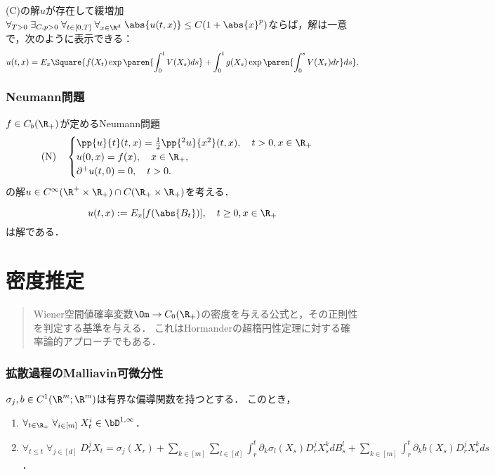 \documentclass[uplatex,dvipdfmx]{jsreport}
\begin{document}
\begin{theorem}
    (C)の解$u$が存在して緩増加$\forall_{T>0}\;\exists_{C,p>0}\;\forall_{t\in[0,T]}\;\forall_{x\in\R^d}\;\abs{u(t,x)}\le C(1+\abs{x}^p)$ならば，解は一意で，次のように表示できる：
    \[u(t,x)=E_x\Square{f(X_t)\exp\paren{\int^t_0V(X_s)ds}+\int^t_0g(X_s)\exp\paren{\int^s_0V(X_r)dr}ds}.\]
\end{theorem}

\subsection{Neumann問題}

\begin{problem}
    $f\in C_b(\R_+)$が定めるNeumann問題
    \[\mathrm{(N)}\quad\begin{cases}
        \pp{u}{t}(t,x)=\frac{1}{2}\pp{^2u}{x^2}(t,x),\quad t>0,x\in\R_+\\
        u(0,x)=f(x),\quad x\in\R_+,\\
        \partial^+u(t,0)=0,\quad t>0.
    \end{cases}\]
    の解$u\in C^\infty(\R^+\times\R_+)\cap C(\R_+\times\R_+)$を考える．
\end{problem}

\begin{theorem}\label{thm-solution-to-Neumann-problem}
    \[u(t,x):=E_x[f(\abs{B_t})],\quad t\ge0,x\in\R_+\]
    は解である．
\end{theorem}

\chapter{密度推定}

\begin{quotation}
    Wiener空間値確率変数$\Om\to C_0(\R_+)$の密度を与える公式と，その正則性を判定する基準を与える．
    これはHormanderの超楕円性定理に対する確率論的アプローチでもある．
\end{quotation}

\subsection{拡散過程のMalliavin可微分性}

\begin{proposition}\label{prop-Malliavin-differentiability-of-diffusion-processes}
    $\sigma_j,b\in C^1(\R^m;\R^m)$は有界な偏導関数を持つとする．
    このとき，
    \begin{enumerate}
        \item $\forall_{t\in\R_+}\;\forall_{i\in[m]}\;X^i_t\in\bD^{1,\infty}$．
        \item $\forall_{t\le t}\;\forall_{j\in[d]}\;D^j_rX_t=\sigma_j(X_r)+\sum_{k\in[m]}\sum_{l\in[d]}\int^t_r\partial_k\sigma_l(X_s)D^j_rX^k_sdB_s^l+\sum_{k\in[m]}\int^t_r\partial_kb(X_s)D^j_rX^k_sds$．
    \end{enumerate}
\end{proposition}
\end{document}

